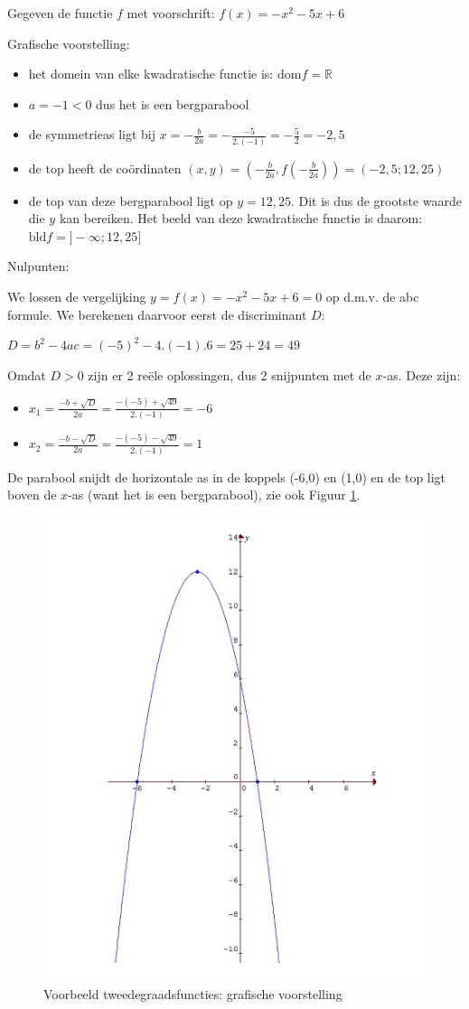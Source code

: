 \begin{voorbeeld}
	Gegeven de functie $f$ met voorschrift: $f(x)=-x^{2}-5x+6$ 

Grafische voorstelling:
\begin{itemize}
\item het domein van elke kwadratische functie is: $\textrm{dom}f=\mathbb{R}$
\item $a=-1<0$ dus het is een bergparabool
\item de symmetrieas ligt bij $x=-\frac{b}{2a}=-\frac{-5}{2.(-1)}=-\frac{5}{2}=-2,5$
\item de top heeft de co\"ordinaten $(x,y)=(-\frac{b}{2a},f(-\frac{b}{2a}))=(-2,5;12,25)$
\item de top van deze bergparabool ligt op $y=12,25$. Dit is dus de grootste
waarde die $y$ kan bereiken. Het beeld van deze kwadratische functie
is daarom: $\textrm{bld}f=]-\infty;12,25]$
\end{itemize}


Nulpunten:

We lossen de vergelijking $y=f(x)=-x^{2}-5x+6=0$ op d.m.v.
de abc formule. We berekenen daarvoor eerst de discriminant $D$:

$D=b^{2}-4ac=(-5)^{2}-4.(-1).6=25+24=49$

Omdat $D>0$ zijn er 2 re\"ele oplossingen, dus 2 snijpunten
met de $x$-as. Deze zijn:
\begin{itemize}
\item $x_{1}=\frac{-b+\sqrt{D}}{2a}=\frac{-(-5)+\sqrt{49}}{2.(-1)}=-6$
\item $x_{2}=\frac{-b-\sqrt{D}}{2a}=\frac{-(-5)-\sqrt{49}}{2.(-1)}=1$
\end{itemize}
De parabool snijdt de horizontale as in de koppels (-6,0) en (1,0)
en de top ligt boven de $x$-as (want het is een bergparabool), zie ook Figuur \ref{fig:tweede:vb}.

\begin{figure}[h]
\centering{}\includegraphics[width=.5\linewidth]{2_elem_rekenvaardigheden_B/inputs/tweedegraadsfuncties3.jpg}
\caption{Voorbeeld tweedegraadsfuncties: grafische voorstelling}
\label{fig:tweede:vb} 
\end{figure}



\end{voorbeeld}
